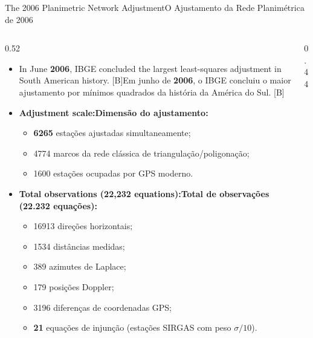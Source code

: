 \documentclass[aspectratio=169,11pt]{beamer}
\newcommand{\tr}[2]{\ifEN#2\else#1\fi}
\newcommand{\bnum}[1]{\ifmmode\textcolor{mTeal}{\mathbf{#1}}\else\textbf{\textcolor{mTeal}{#1}}\fi}
\begin{document}
\begin{frame}{\tr{O Ajustamento da Rede Planimétrica de 2006}{The 2006 Planimetric Network Adjustment}}
  \begin{columns}[onlytextwidth]
    \begin{column}{0.52\textwidth}
      \begin{itemize}
        \setlength{\itemsep}{4pt}
        \scriptsize
        \item \tr{Em junho de \bnum{2006}, o IBGE concluiu o maior ajustamento por mínimos quadrados
              da história da América do Sul. [B]}{In June \bnum{2006}, IBGE concluded the largest
              least-squares adjustment in South American history. [B]}
        \item \tr{\textbf{Dimensão do ajustamento:}}{\textbf{Adjustment scale:}}
              \begin{itemize}
                \tiny
                \item \bnum{\num{6265}} estações ajustadas simultaneamente;
                \item \num{4774} marcos da rede clássica de triangulação/poligonação;
                \item \num{1600} estações ocupadas por GPS moderno.
              \end{itemize}
        \item \tr{\textbf{Total de observações (22.232 equações):}}{\textbf{Total observations (22,232 equations):}}
              \begin{itemize}
                \tiny
                \item \num{16913} direções horizontais;
                \item \num{1534} distâncias medidas;
                \item \num{389} azimutes de Laplace;
                \item \num{179} posições Doppler;
                \item \num{3196} diferenças de coordenadas GPS;
                \item \bnum{\num{21}} equações de injunção (estações SIRGAS com peso $\sigma/10$).
              \end{itemize}
      \end{itemize}
    \end{column}
    \begin{column}{0.44\textwidth}
\end{column}
\end{columns}
\end{frame}
\end{document}
